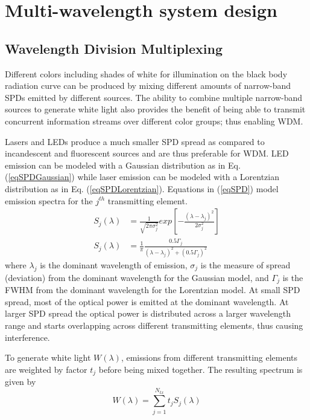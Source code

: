 \section{Multi-wavelength system design}
\label{sec:wdmSystem}
\graphicspath{{_System/figures_wdm/}}

\subsection{Wavelength Division Multiplexing}
\label{subsec:wdmSystemWdm}

Different colors including shades of white for illumination on the black body radiation curve can be produced by mixing different amounts of narrow-band SPDs emitted by different sources. The ability to combine multiple narrow-band sources to generate white light also provides the benefit of being able to transmit concurrent information streams over different color groups; thus enabling WDM. 

Lasers and LEDs produce a much smaller SPD spread as compared to incandescent and fluorescent sources and are thus preferable for WDM. LED emission can be modeled with a Gaussian distribution as in Eq. (\ref{eqSPDGaussian}) while laser emission can be modeled with a Lorentzian distribution as in Eq. (\ref{eqSPDLorentzian}). Equations in (\ref{eqSPD}) model emission spectra for the $j^{th}$ transmitting element.
\begin{subequations}
\begin{align}
S_j(\lambda) &= \frac{1}{\sqrt{2\pi\sigma_j^2}}exp\left[-\frac{(\lambda-\lambda_j)^2}{2\sigma_j^2}\right]\label{eqSPDGaussian}\\
S_j(\lambda) &= \frac{1}{\pi}\frac{0.5\Gamma_j}{(\lambda-\lambda_j)^2 + (0.5\Gamma_j)^2}\label{eqSPDLorentzian}
\end{align}
\label{eqSPD}
\end{subequations}
where $\lambda_j$ is the dominant wavelength of emission, $\sigma_j$ is the measure of spread (deviation) from the dominant wavelength for the Gaussian model, and $\Gamma_j$ is the FWHM from the dominant wavelength for the Lorentzian model. At small SPD spread, most of the optical power is emitted at the dominant wavelength. At larger SPD spread the optical power is distributed across a larger wavelength range and starts overlapping across different transmitting elements, thus causing interference.

To generate white light $W(\lambda)$, emissions from different transmitting elements are weighted by factor $t_j$ before being mixed together. The resulting spectrum is given by
\begin{equation}
	\label{eqWhite}
	W(\lambda) = \sum_{j=1}^{N_{tx}}t_jS_j(\lambda)
\end{equation}

